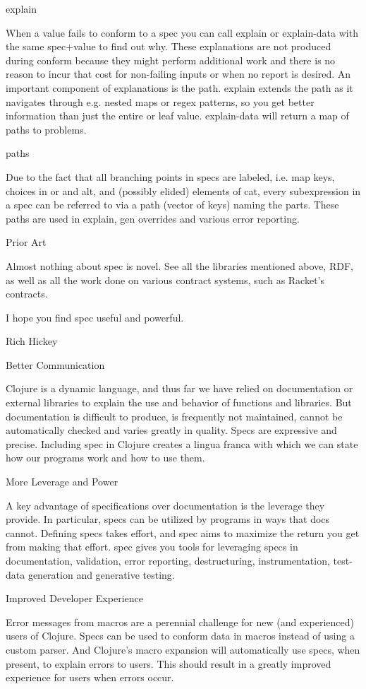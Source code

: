 explain

When a value fails to conform to a spec you can call explain or explain-data with the same spec+value to find out why. These explanations are not produced during conform because they might perform additional work and there is no reason to incur that cost for non-failing inputs or when no report is desired. An important component of explanations is the path. explain extends the path as it navigates through e.g. nested maps or regex patterns, so you get better information than just the entire or leaf value. explain-data will return a map of paths to problems.

paths

Due to the fact that all branching points in specs are labeled, i.e. map keys, choices in or and alt, and (possibly elided) elements of cat, every subexpression in a spec can be referred to via a path (vector of keys) naming the parts. These paths are used in explain, gen overrides and various error reporting.

Prior Art

Almost nothing about spec is novel. See all the libraries mentioned above, RDF, as well as all the work done on various contract systems, such as Racket’s contracts.

I hope you find spec useful and powerful.

Rich Hickey

Better Communication

Clojure is a dynamic language, and thus far we have relied on documentation or external libraries to explain the use and behavior of functions and libraries. But documentation is difficult to produce, is frequently not maintained, cannot be automatically checked and varies greatly in quality. Specs are expressive and precise. Including spec in Clojure creates a lingua franca with which we can state how our programs work and how to use them.

More Leverage and Power

A key advantage of specifications over documentation is the leverage they provide. In particular, specs can be utilized by programs in ways that docs cannot. Defining specs takes effort, and spec aims to maximize the return you get from making that effort. spec gives you tools for leveraging specs in documentation, validation, error reporting, destructuring, instrumentation, test-data generation and generative testing.

Improved Developer Experience

Error messages from macros are a perennial challenge for new (and experienced) users of Clojure. Specs can be used to conform data in macros instead of using a custom parser. And Clojure’s macro expansion will automatically use specs, when present, to explain errors to users. This should result in a greatly improved experience for users when errors occur.

